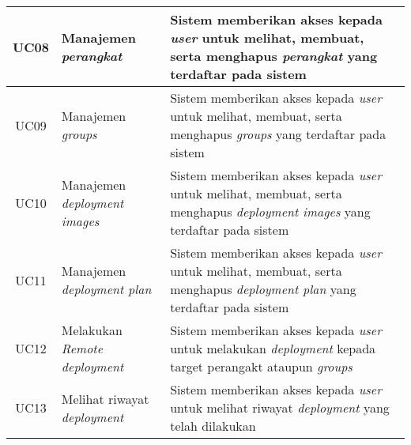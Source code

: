 \begin{table}[ht]
\begin{tabular}{|c|p{4cm}|p{7.5cm}|}
    \hline
    UC08 & Manajemen \textit{perangkat}               & Sistem memberikan akses kepada \textit{user} untuk melihat, membuat, serta menghapus \textit{perangkat} yang terdaftar pada sistem         \\
    \hline
    UC09 & Manajemen \textit{groups}                  & Sistem memberikan akses kepada \textit{user} untuk melihat, membuat, serta menghapus \textit{groups} yang terdaftar pada sistem            \\
    \hline
    UC10 & Manajemen \textit{deployment images}       & Sistem memberikan akses kepada \textit{user} untuk melihat, membuat, serta menghapus \textit{deployment images} yang terdaftar pada sistem \\
    \hline
    UC11 & Manajemen \textit{deployment plan}         & Sistem memberikan akses kepada \textit{user} untuk melihat, membuat, serta menghapus \textit{deployment plan} yang terdaftar pada sistem   \\
    \hline
    UC12 & Melakukan \textit{Remote deployment}       & Sistem memberikan akses kepada \textit{user} untuk melakukan \textit{deployment} kepada target perangakt ataupun \textit{groups}           \\
    \hline
    UC13 & Melihat riwayat \textit{deployment}        & Sistem memberikan akses kepada \textit{user} untuk melihat riwayat \textit{deployment} yang telah dilakukan                                \\
    \hline
  \end{tabular}
\end{table}
\egroup